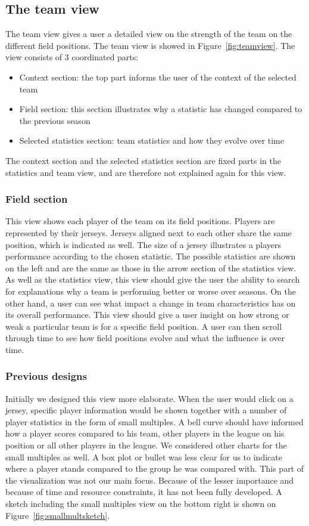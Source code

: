 \documentclass[]{sigchi}
\begin{document}
\subsection{The team view}
The team view gives a user a detailed view on the strength of the team on the 
different field positions. The team view is showed in Figure~\ref{fig:teamview}. 
The view consists of 3 coordinated parts:
\begin{itemize}
    \item Context section: the top part informs the user of the context of the
        selected team
    \item Field section: this section illustrates why a statistic has changed
        compared to the previous season
    \item Selected statistics section: team statistics and how they evolve over
        time
\end{itemize}
The context section and the selected statistics section are fixed parts in the 
statistics and team view, and are therefore not explained again for this view.

\subsubsection{Field section}
This view shows each player of the team on its field positions. Players are
represented by their jerseys. Jerseys aligned next to each other share the same
position, which is indicated as well. The size of a jersey illustrates a
players performance according to the chosen statistic. The possible statistics 
are shown on the left and are the same as those in the arrow section of the 
statistics view. As well as the statistics view, this view should give the user 
the ability to search for explanations why a team is performing better or worse 
over seasons. On the other hand, a user can see what impact a change in team 
characteristics has on its overall performance. This view should give a user 
insight on how strong or weak a particular team is for a specific field position. 
A user can then scroll through time to see how field positions evolve and what 
the influence is over time.

\subsubsection{Previous designs}
Initially we designed this view more elaborate. When the user would click on a
jersey, specific player information would be shown together with a number of
player statistics in the form of small multiples. A bell curve should have
informed how a player scores compared to his team, other players in the league
on his position or all other players in the league. We considered other charts
for the small multiples as well. A box plot or bullet was less clear for us to
indicate where a player stands compared to the group he was compared with. This
part of the visualization was not our main focus. Because of the lesser
importance and because of time and resource constraints, it has not been fully
developed. A sketch including the small multiples view on the bottom right is
shown on Figure~\ref{fig:smallmultsketch}.
\end{document}
